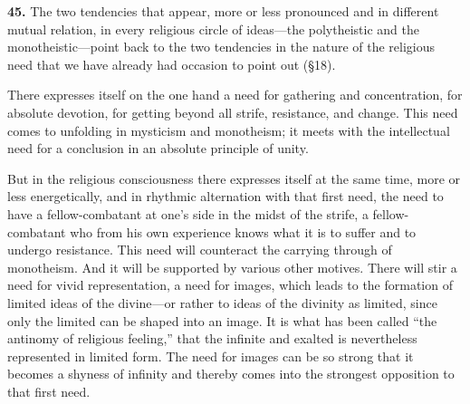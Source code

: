 \documentclass[12pt,a4paper]{book}
\newcommand{\opage}[1]{\marginnote{\footnotesize\textit{[#1]}}}
\begin{document}
\medskip

\noindent
\opage{106}\textbf{45.} The two tendencies that appear, more or less pronounced and in
different mutual relation, in every religious circle of ideas---the polytheistic and the
monotheistic---point back to the two tendencies in the nature of the religious need that
we have already had occasion to point out (§18).

There expresses itself on the one hand a need for gathering and concentration, for absolute
devotion, for getting beyond all strife, resistance, and change. This need comes to
unfolding in mysticism and monotheism; it meets with the intellectual need for a conclusion
in an absolute principle of unity.

But in the religious consciousness there expresses itself at the same time, more or less
energetically, and in rhythmic alternation with that first need, the need to have a
fellow-combatant at one's side in the midst of the strife, a fellow-combatant who from his
own experience knows what it is to suffer and to undergo resistance. This need will
counteract the carrying through of monotheism. And it will be supported by various other
motives. There will stir a need for vivid representation, a need for images, which leads to
the formation of limited ideas of the divine---or rather to ideas of the divinity as
limited, since only the limited can be shaped into an image. It is what has been called
``the antinomy of religious feeling,'' that the infinite and exalted is nevertheless
represented in limited form. The need for images can be so strong that it becomes a shyness
of infinity and thereby comes into the strongest opposition to that first need.
\end{document}
